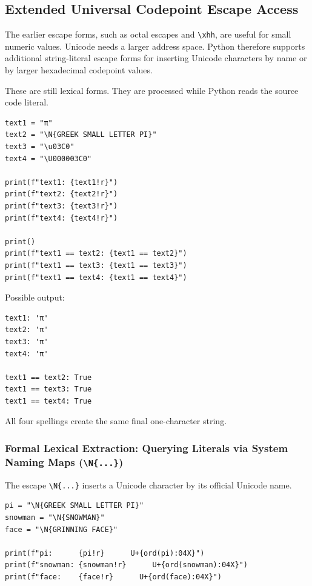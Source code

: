 \subsection{Extended Universal Codepoint Escape Access}

The earlier escape forms, such as octal escapes and \texttt{\textbackslash xhh}, are useful for small numeric values. Unicode needs a larger address space. Python therefore supports additional string-literal escape forms for inserting Unicode characters by name or by larger hexadecimal codepoint values.

These are still lexical forms. They are processed while Python reads the source code literal.

\begin{verbatim}
text1 = "π"
text2 = "\N{GREEK SMALL LETTER PI}"
text3 = "\u03C0"
text4 = "\U000003C0"

print(f"text1: {text1!r}")
print(f"text2: {text2!r}")
print(f"text3: {text3!r}")
print(f"text4: {text4!r}")

print()
print(f"text1 == text2: {text1 == text2}")
print(f"text1 == text3: {text1 == text3}")
print(f"text1 == text4: {text1 == text4}")
\end{verbatim}

Possible output:

\begin{verbatim}
text1: 'π'
text2: 'π'
text3: 'π'
text4: 'π'

text1 == text2: True
text1 == text3: True
text1 == text4: True
\end{verbatim}

All four spellings create the same final one-character string.

\subsubsection{Formal Lexical Extraction: Querying Literals via System Naming Maps (\texttt{\textbackslash N\{...\}})}

The escape \texttt{\textbackslash N\{...\}} inserts a Unicode character by its official Unicode name.

\begin{verbatim}
pi = "\N{GREEK SMALL LETTER PI}"
snowman = "\N{SNOWMAN}"
face = "\N{GRINNING FACE}"

print(f"pi:      {pi!r}      U+{ord(pi):04X}")
print(f"snowman: {snowman!r}      U+{ord(snowman):04X}")
print(f"face:    {face!r}      U+{ord(face):04X}")
\end{verbatim}

